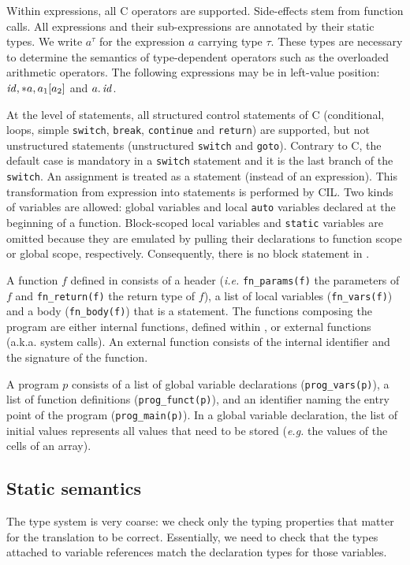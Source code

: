 \documentclass[namedreferences]{kluwer}
\begin{document}
\begin{article}

Within expressions, all C operators are supported. 
Side-effects stem from function calls. 
All expressions and their sub-expressions are
annotated by their static types.  We write $a^\tau$ for the expression
$a$ carrying type $\tau$.  These types are necessary to determine the
semantics of type-dependent operators such as the overloaded
arithmetic operators. The following expressions may be in left-value 
position: $\mathit{id}, *a, a_1[a_2]$ and $a .\, \mathit{id}$. 



At the level of statements, all structured control statements of C
(conditional, loops, simple {\tt switch}, {\tt break}, {\tt continue} and 
{\tt return}) are supported, but not unstructured statements 
(unstructured {\tt switch} and {\tt goto}).  
Contrary to C, the default case is mandatory in a \Clight{} {\tt switch} statement
and it is the last branch of the {\tt switch}.
An assignment is treated as a statement (instead of an expression).
This transformation from expression into statements is performed by CIL.
Two kinds of variables are allowed: global variables and local {\tt auto}
variables declared at the beginning of a function.  Block-scoped local
variables and {\tt static} variables are omitted because they are emulated by
pulling their declarations to function scope or global scope,
respectively.  Consequently, there is no block statement in \Clight{}.

A function $f$ defined in \Clight{} consists of a header (\textit{i.e.}
{\tt fn\_params(f)} the parameters of $f$ and {\tt fn\_return(f)} 
the return type of $f$), a list of local variables ({\tt fn\_vars(f)}) 
and a body ({\tt fn\_body(f)}) that is a statement. The functions composing 
the program are either internal functions, defined within \Clight{}, or 
external functions (a.k.a. system calls). An external function consists 
of the internal identifier and the signature of the function. 

A program $p$ consists of a list of global variable declarations
({\tt prog\_vars(p)}), a list of function definitions ({\tt prog\_funct(p)}), 
and an identifier naming the entry point of the program ({\tt prog\_main(p)}).
In a global variable declaration, the list of initial values
represents all values that need to be stored (\textit{e.g.} the
values of the cells of an array).



\subsection{Static semantics}
 The type system is very coarse: we check only the typing properties
  that matter for the translation to be correct.  Essentially,
  we need to check that the types attached to variable references
  match the declaration types for those variables.


\end{article}
\end{document}
